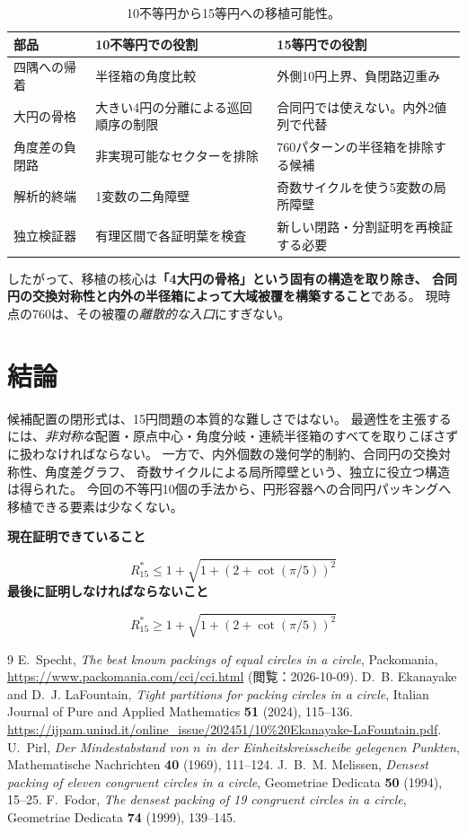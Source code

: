 \documentclass[11pt,a4paper]{article}
\theoremstyle{JPthm}
\theoremstyle{definition}
\newcommand{\Rstar}{R_{15}^{*}}
\begin{document}
\begin{table}[H]\centering
\caption{10不等円から15等円への移植可能性。}
\begin{tabularx}{\linewidth}{@{}p{.28\linewidth}X X@{}}
\toprule
部品 & 10不等円での役割 & 15等円での役割\\
\midrule
四隅への帰着 & 半径箱の角度比較 & 外側10円上界、負閉路辺重み\\
大円の骨格 & 大きい4円の分離による巡回順序の制限 & 合同円では使えない。内外2値列で代替\\
角度差の負閉路 & 非実現可能なセクターを排除 & 760パターンの半径箱を排除する候補\\
解析的終端 & 1変数の二角障壁 & 奇数サイクルを使う5変数の局所障壁\\
独立検証器 & 有理区間で各証明葉を検査 & 新しい閉路・分割証明を再検証する必要\\
\bottomrule
\end{tabularx}
\end{table}

したがって、移植の核心は\textbf{「4大円の骨格」という固有の構造を取り除き、
合同円の交換対称性と内外の半径箱によって大域被覆を構築すること}である。
現時点の760は、その被覆の\emph{離散的な入口}にすぎない。

\section{結論}
候補配置の閉形式は、15円問題の本質的な難しさではない。
最適性を主張するには、\emph{非対称な}配置・原点中心・角度分岐・連続半径箱のすべてを取りこぼさずに扱わなければならない。
一方で、内外個数の幾何学的制約、合同円の交換対称性、角度差グラフ、
奇数サイクルによる局所障壁という、独立に役立つ構造は得られた。
今回の不等円10個の手法から、円形容器への合同円パッキングへ移植できる要素は少なくない。

\begin{keybox}
\centering
\textbf{現在証明できていること}\par
\[
 \boxed{\Rstar\le
 1+\sqrt{1+(2+\cot(\pi/5))^2}}
\]
\textbf{最後に証明しなければならないこと}\par
\[
 \boxed{\Rstar\ge
 1+\sqrt{1+(2+\cot(\pi/5))^2}}
\]
\end{keybox}

\begin{thebibliography}{9}
E.~Specht, \emph{The best known packings of equal circles in a circle}, Packomania, 
\url{https://www.packomania.com/cci/cci.html} (閲覧：2026-10-09).
D.~B. Ekanayake and D.~J. LaFountain,
\emph{Tight partitions for packing circles in a circle},
Italian Journal of Pure and Applied Mathematics \textbf{51} (2024), 115--136.
\url{https://ijpam.uniud.it/online_issue/202451/10%20Ekanayake-LaFountain.pdf}.
U.~Pirl, \emph{Der Mindestabstand von $n$ in der Einheitskreisscheibe gelegenen Punkten},
Mathematische Nachrichten \textbf{40} (1969), 111--124.
J.~B.~M. Melissen, \emph{Densest packing of eleven congruent circles in a circle},
Geometriae Dedicata \textbf{50} (1994), 15--25.
F.~Fodor, \emph{The densest packing of 19 congruent circles in a circle},
Geometriae Dedicata \textbf{74} (1999), 139--145.
\end{thebibliography}
\end{document}
